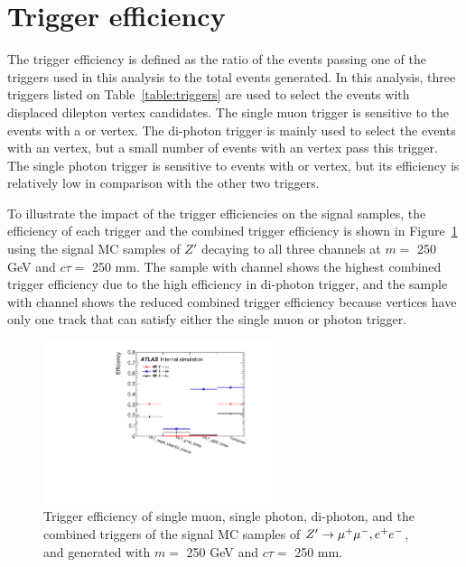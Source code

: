 \section{Trigger efficiency}
\label{sec:trigger_efficiency}
The trigger efficiency is defined as the ratio of the events passing one of the triggers used in this analysis to the total events generated. In this analysis, three triggers listed on Table~\ref{table:triggers} are used to select the events with displaced dilepton vertex candidates. The single muon trigger is sensitive to the events with a \mumu or \emu vertex. The di-photon trigger is mainly used to select the events with an \ee vertex, but a small number of events with an \emu vertex pass this trigger. The single photon trigger is sensitive to events with \ee or \emu vertex, but its efficiency is relatively low in comparison with the other two triggers.

To illustrate the impact of the trigger efficiencies on the signal samples, the efficiency of each trigger and the combined trigger efficiency is shown in Figure~\ref{fig:m_trig_eff_allchannel} using the signal MC samples of $Z'$ decaying to all three channels at $m = $ 250 GeV and $c\tau=$ 250 mm. The sample with \ee channel shows the highest combined trigger efficiency due to the high efficiency in di-photon trigger, and the sample with \emu channel shows the reduced combined trigger efficiency because \emu vertices have only one track that can satisfy either the single muon or photon trigger.

\begin{figure}[!htb]
	\includegraphics[width=0.60\textwidth]{figures/m_dv_eff_trig_allchannel.pdf}
	\centering
	\caption{Trigger efficiency of single muon, single photon, di-photon, and the combined triggers of the signal MC samples of $Z'\rightarrow\mu^{+}\mu^{-}, e^{+}e^{-}$, and \emu generated with $m=$ 250 GeV and $c\tau=$ 250 mm.}
	\label{fig:m_trig_eff_allchannel}
\end{figure}

